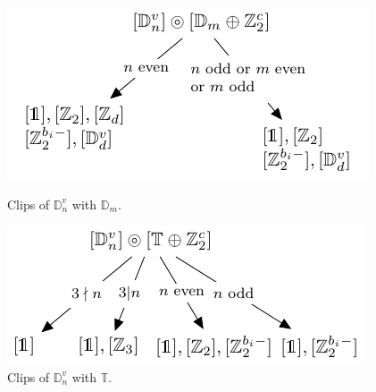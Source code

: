 \documentclass[11pt,a4paper]{amsart}
\theoremstyle{definition}
\newcommand{\tetra}{\mathbb{T}}             %
\newcommand{\DD}{\mathbb{D}}                %
\newcommand{\1}{\mathds{1}}		            %
\begin{document}
\begin{figure}[h!]
	\begin{minipage}[b]{0.5\linewidth}
		\centering \includegraphics[width=0.8\linewidth]{"Figures piezo/graphe7'"}
		\caption{Clips of $\DD_n^v$ with $\DD_m$.}
		\label{fig:graphe7}
	\end{minipage}\hfill
	\begin{minipage}[b]{0.5\linewidth}
		\centering \includegraphics[width=0.8\linewidth]{"Figures piezo/graphe8'"}
		\caption{Clips of $\DD_n^v$ with $\tetra$.}
		\label{fig:graphe8}
	\end{minipage}
\end{figure}
\end{document}
